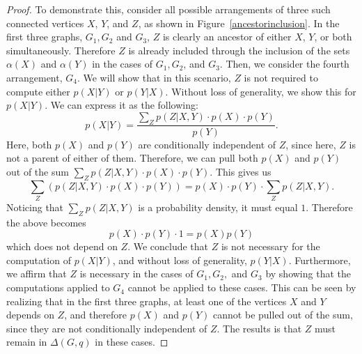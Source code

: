 \begin{proof}
To demonstrate this, consider all possible arrangements of three such connected vertices $X$, $Y$, and $Z$, as shown in Figure~\ref{ancestorinclusion}. In the first three graphs, $G_{1}, G_{2}$ and $G_{3}$, $Z$ is clearly an ancestor of either $X$, $Y$, or both simultaneously. Therefore $Z$ is already included through the inclusion of the sets $\alpha(X)$ and $\alpha(Y)$ in the cases of $G_{1}, G_{2}$, and $G_{3}$. Then, we consider the fourth arrangement, $G_{4}$. We will show that in this scenario, $Z$ is not required to compute either $p(X|Y)$ or $p(Y|X)$. Without loss of generality, we show this for $p(X|Y)$. We can express it as the following: \newline
$$p(X|Y) = \frac{\sum_{Z} p(Z|X,Y)\cdot p(X)\cdot p(Y)}{p(Y)}.$$ Here, both $p(X)$ and $p(Y)$ are conditionally independent of $Z$, since here, $Z$ is not a parent of either of them. Therefore, we can pull both $p(X)$ and $p(Y)$ out of the sum $\sum_{Z}p(Z|X,Y)\cdot p(X) \cdot p(Y)$. This gives us 
$$\sum_{Z} (p(Z|X,Y)\cdot p(X) \cdot p(Y)) = p(X) \cdot p(Y) \cdot \sum_{Z} p(Z|X,Y).$$
Noticing that $\sum_{Z}p(Z|X,Y)$ is a probability density, it must equal $1$. Therefore the above becomes 
$$p(X) \cdot p(Y) \cdot 1 = p(X) p(Y)$$
which does not depend on $Z$. We conclude that $Z$ is not necessary for the computation of $p(X|Y)$, and without loss of generality, $p(Y|X)$. \newline
\null \quad \quad Furthermore, we affirm that $Z$ is necessary in the cases of $G_{1}, G_{2},$ and $G_{3}$ by showing that the computations applied to $G_{4}$ cannot be applied to these cases. This can be seen by realizing that in the first three graphs, at least one of the vertices $X$ and $Y$ depends on $Z$, and therefore $p(X)$ and $p(Y)$ cannot be pulled out of the sum, since they are not conditionally independent of $Z$. The results is that $Z$ must remain in $\Delta(G,q)$ in these cases. 
\end{proof}



